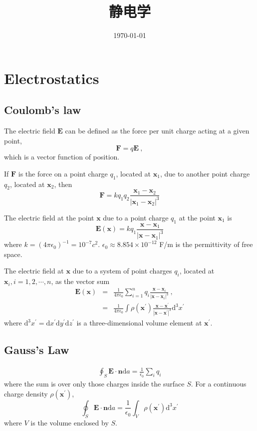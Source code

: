 \documentclass[12pt,a4paper]{article}
\title{静电学}
\author{}
\date{\today}
\renewcommand{\vec}[1]{\boldsymbol{#1}}
\newcommand{\dif}{\mathrm{d}}
\begin{document}
\maketitle

\section{Electrostatics}
\subsection{Coulomb's law}
The electric field $\vec{E}$ can be defined as the force per unit charge acting at a given point, 
\begin{equation}
\vec{F} = q \vec{E} ~,
\end{equation}
which is a vector function of position.

If $\vec{F}$ is the force on a point charge $q_1$, located at $\vec{x}_1$, due to another point charge $q_2$, located at $\vec{x}_2$, then
\begin{equation}
\vec{F} = k q_1 q_2 \frac{\vec{x}_1 -\vec{x}_2}{|\vec{x}_1 -\vec{x}_2|^3}
\end{equation}

The electric field at the point $\vec{x}$ due to a point charge $q_1$ at the point $\vec{x}_1$ is
\begin{equation}
\vec{E}(\vec{x}) = k q_1 \frac{\vec{x} -\vec{x}_1}{|\vec{x} -\vec{x}_1|^3}
\end{equation}
where $k = (4\pi \epsilon_0)^{-1} = 10^{-7} c^2$. $\epsilon_0 \approx 8.854 \times 10^{-12}$ F/m is the permittivity of free space.

The electric field at $\vec{x}$ due to a system of point charges $q_i$, located at $\vec{x}_i, i = 1, 2, \cdots, n$, as the vector sum 
\begin{eqnarray*}
\vec{E}(\vec{x}) &=& \frac{1}{4\pi \epsilon_0} \sum_{i=1}^n q_i \frac{\vec{x} -\vec{x}_i}{|\vec{x} -\vec{x}_i|^3} ~, \\
&=& \frac{1}{4\pi \epsilon_0} \int \rho(\vec{x}^\prime) \frac{\vec{x} -\vec{x}^\prime}{|\vec{x} -\vec{x}^\prime|^3} \dif^3 x^\prime
\end{eqnarray*}
where $\dif^3 x^\prime = \dif x^\prime \dif y^\prime \dif z^\prime$ is a three-dimensional volume element at $\vec{x}^\prime$.


\subsection{Gauss's Law}
\begin{eqnarray}
\oint_S \vec{E} \cdot \vec{n} \dif a = \frac{1}{\epsilon_0} \sum_i q_i
\end{eqnarray}
where the sum is over only those charges inside the surface $S$. For a continuous charge density $\rho(\vec{x}^\prime)$, 
\begin{equation}
\oint_S \vec{E} \cdot \vec{n} \dif a = \frac{1}{\epsilon_0} \int_V \rho(\vec{x}^\prime) \dif^3 x^\prime
\end{equation}
where $V$ is the volume enclosed by $S$.
\end{document}
